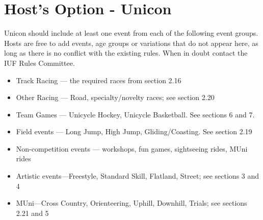 \section{Host's Option - Unicon}
Unicon should include at least one event from each of the following event groups. 
Hosts are free to add events, age groups or variations that do not appear here, as long as there is no conflict with the existing rules. 
When in doubt contact the IUF Rules Committee.
\begin{itemize}
  \item{Track Racing — the required races from section 2.16}
  \item{Other Racing — Road, specialty/novelty races; see section 2.20}
  \item{Team Games — Unicycle Hockey, Unicycle Basketball. See sections 6 and 7.}
  \item{Field events — Long Jump, High Jump, Gliding/Coasting. See section 2.19}
  \item{Non-competition events — workshops, fun games, sightseeing rides, MUni rides}
  \item{Artistic events—Freestyle, Standard Skill, Flatland, Street; see sections 3 and 4}
  \item{MUni—Cross Country, Orienteering, Uphill, Downhill, Trials; see sections 2.21 and 5}
\end{itemize}
